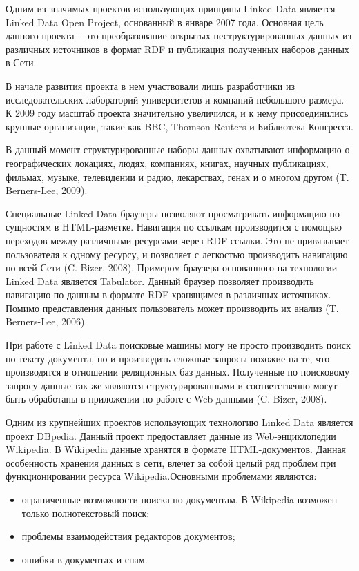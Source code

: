 Одним из значимых проектов использующих принципы Linked Data является Linked Data Open Project, основанный в январе 2007 года. Основная цель данного проекта – это преобразование открытых неструктурированных данных из различных источников в формат RDF и публикация полученных наборов данных в Сети.

В начале развития проекта в нем участвовали лишь разработчики из исследовательских лабораторий университетов и компаний небольшого размера. К 2009 году масштаб проекта значительно увеличился, и к нему присоединились крупные организации, такие как BBC, Thomson Reuters и Библиотека Конгресса.

В данный момент структурированные наборы данных охватывают информацию о географических локациях, людях, компаниях, книгах, научных публикациях, фильмах, музыке, телевидении и радио, лекарствах, генах и о многом другом (T. Berners-Lee, 2009). 

Специальные Linked Data браузеры позволяют просматривать информацию по сущностям в HTML-разметке. Навигация по ссылкам производится с помощью переходов между различными ресурсами через RDF-ссылки. Это не привязывает пользователя к одному ресурсу, и позволяет с легкостью производить навигацию по всей Сети (C. Bizer, 2008). Примером браузера основанного на технологии Linked Data является Tabulator. Данный браузер позволяет производить навигацию по данным в формате RDF хранящимся в различных источниках. Помимо представления данных пользователь может производить их анализ (T. Berners-Lee, 2006).

При работе с Linked Data поисковые машины могу не просто производить поиск по тексту документа, но и производить сложные запросы похожие на те, что производятся в отношении реляционных баз данных. Полученные по поисковому запросу данные так же являются структурированными и соответственно могут быть обработаны в приложении по работе с Web-данными (C. Bizer, 2008).

Одним из крупнейших проектов использующих технологию Linked Data является проект DBpedia. Данный проект предоставляет данные из Web-энциклопедии Wikipedia. В Wikipedia данные хранятся в формате HTML-документов. Данная особенность хранения данных в сети, влечет за собой целый ряд проблем при функционировании ресурса Wikipedia.Основными проблемами являются:

\begin{itemize}
\item ограниченные возможности поиска по документам. В Wikipedia возможен только полнотекстовый поиск;
\item проблемы взаимодействия редакторов документов;
\item ошибки в документах и спам.
\end{itemize}

